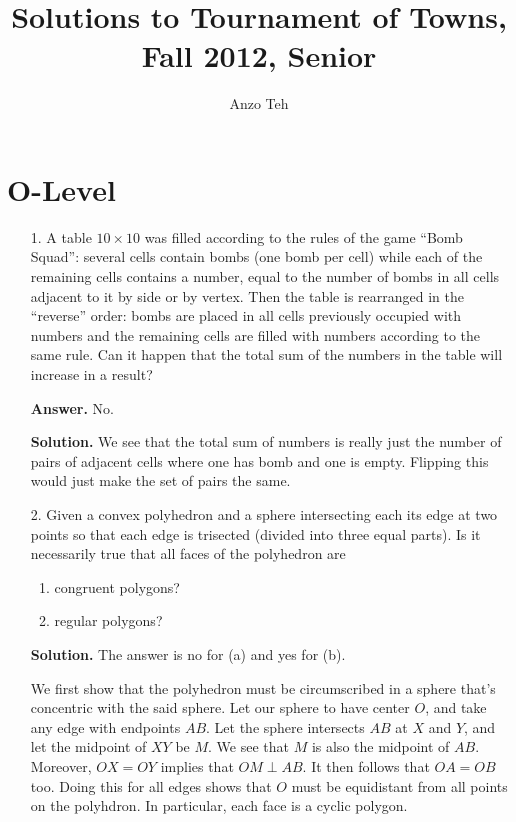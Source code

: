 \documentclass[11pt,a4paper]{article}
\begin{document}
\newcommand{\la}{\leftarrow}
\newcommand{\lra}{\leftrightarrow}
\newcommand{\bbN}{\mathbb{N}}
\newcommand{\bbZ}{\mathbb{Z}}
\newcommand{\dsum}{\displaystyle\sum}
\newcommand{\dprod}{\displaystyle\prod}


\title{Solutions to Tournament of Towns, Fall 2012, Senior}
\author{Anzo Teh}
\date{}
\maketitle

\section*{O-Level}
\begin{enumerate}
	\item[1.] A table $10 \times 10$ was filled according to the rules of the game ``Bomb Squad'': several
	cells contain bombs (one bomb per cell) while each of the remaining cells contains a number,
	equal to the number of bombs in all cells adjacent to it by side or by vertex.
	Then the table is rearranged in the “reverse” order: bombs are placed in all cells previously
	occupied with numbers and the remaining cells are filled with numbers according to the same
	rule. Can it happen that the total sum of the numbers in the table will increase in a result?
	
	\textbf{Answer.} No. 
	
	\textbf{Solution.} 
	We see that the total sum of numbers is really just the number of pairs of  adjacent cells where 
	one has bomb and one is empty. Flipping this would just make the set of pairs the same. 
	
	\item[2.]Given a convex polyhedron and a sphere intersecting each its edge at two points so that
	each edge is trisected (divided into three equal parts). Is it necessarily true that all faces of
	the polyhedron are
	\begin{enumerate}
		\item congruent polygons?
		\item regular polygons?
	\end{enumerate}
    
    \textbf{Solution.} The answer is no for (a) and yes for (b). 
    
    We first show that the polyhedron must be circumscribed in a sphere that's concentric with the said sphere. 
    Let our sphere to have center $O$, 
    and take any edge with endpoints $AB$. 
    Let the sphere intersects $AB$ at $X$ and $Y$, 
    and let the midpoint of $XY$ be $M$. 
    We see that $M$ is also the midpoint of $AB$. 
    Moreover, $OX=OY$ implies that $OM\perp AB$. 
    It then follows that $OA=OB$ too. 
    Doing this for all edges shows that $O$ must be equidistant from all points on the polyhdron. 
    In particular, each face is a cyclic polygon. 
    

\end{enumerate}
\end{document}
